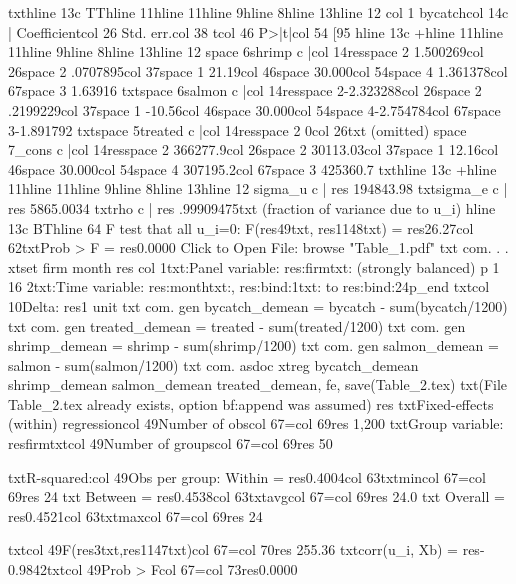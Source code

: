 {txt}{hline 13}{c TT}{hline 11}{hline 11}{hline 9}{hline 8}{hline 13}{hline 12}
{col 1}     bycatch{col 14}{c |} Coefficient{col 26}  Std. err.{col 38}      t{col 46}   P>|t|{col 54}     [95%
{hline 13}{c +}{hline 11}{hline 11}{hline 9}{hline 8}{hline 13}{hline 12}
{space 6}shrimp {c |}{col 14}{res}{space 2} 1.500269{col 26}{space 2} .0707895{col 37}{space 1}   21.19{col 46}{space 3}0.000{col 54}{space 4} 1.361378{col 67}{space 3}  1.63916
{txt}{space 6}salmon {c |}{col 14}{res}{space 2}-2.323288{col 26}{space 2} .2199229{col 37}{space 1}  -10.56{col 46}{space 3}0.000{col 54}{space 4}-2.754784{col 67}{space 3}-1.891792
{txt}{space 5}treated {c |}{col 14}{res}{space 2}        0{col 26}{txt}  (omitted)
{space 7}_cons {c |}{col 14}{res}{space 2} 366277.9{col 26}{space 2} 30113.03{col 37}{space 1}   12.16{col 46}{space 3}0.000{col 54}{space 4} 307195.2{col 67}{space 3} 425360.7
{txt}{hline 13}{c +}{hline 11}{hline 11}{hline 9}{hline 8}{hline 13}{hline 12}
     sigma_u {c |} {res} 194843.98
     {txt}sigma_e {c |} {res} 5865.0034
         {txt}rho {c |} {res} .99909475{txt}   (fraction of variance due to u_i)
{hline 13}{c BT}{hline 64}
F test that all u_i=0: F({res}49{txt}, {res}1148{txt}) = {res}26.27{col 62}{txt}Prob > F = {res}0.0000
Click to Open File:  {browse "Table_1.pdf"}
{txt}
{com}. 
. 
. xtset firm month
{res}
{col 1}{txt:Panel variable: }{res:firm}{txt: (strongly balanced)}
{p 1 16 2}{txt:Time variable: }{res:month}{txt:, }{res:{bind:1}}{txt: to }{res:{bind:24}}{p_end}
{txt}{col 10}Delta: {res}1 unit
{txt}
{com}. gen bycatch_demean = bycatch - sum(bycatch/1200)
{txt}
{com}. gen treated_demean = treated - sum(treated/1200) 
{txt}
{com}. gen shrimp_demean = shrimp - sum(shrimp/1200)
{txt}
{com}. gen salmon_demean = salmon - sum(salmon/1200) 
{txt}
{com}. asdoc xtreg bycatch_demean shrimp_demean salmon_demean treated_demean, fe, save(Table_2.tex)
{txt}(File Table_2.tex already exists, option {bf:append} was assumed)
{res}
{txt}Fixed-effects (within) regression{col 49}Number of obs{col 67}={col 69}{res}     1,200
{txt}Group variable: {res}firm{txt}{col 49}Number of groups{col 67}={col 69}{res}        50

{txt}R-squared:{col 49}Obs per group:
     Within  = {res}0.4004{col 63}{txt}min{col 67}={col 69}{res}        24
{txt}     Between = {res}0.4538{col 63}{txt}avg{col 67}={col 69}{res}      24.0
{txt}     Overall = {res}0.4521{col 63}{txt}max{col 67}={col 69}{res}        24

{txt}{col 49}F({res}3{txt},{res}1147{txt}){col 67}={col 70}{res}   255.36
{txt}corr(u_i, Xb) = {res}-0.9842{txt}{col 49}Prob > F{col 67}={col 73}{res}0.0000

